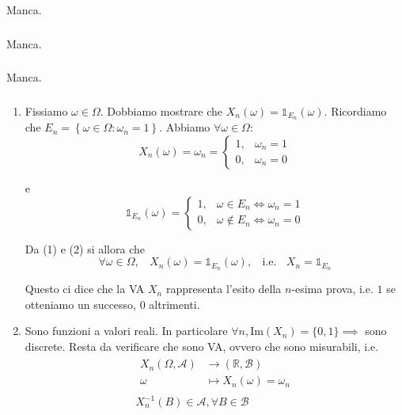 Manca.
\subsubsection{}

Manca.
\subsubsection{}

Manca.
\subsubsection{}
\begin{enumerate}
\item Fissiamo $\omega \in \Omega $. Dobbiamo mostrare che $X_{n}\left( \omega \right) =\mathbb{1}_{E_{n}}\left( \omega \right)$. Ricordiamo che $E_{n} =\left\{\omega \in \Omega :\omega _{n} =1\right\}$. Abbiamo $\forall \omega \in \Omega $:\begin{equation}
X_{n}\left( \omega \right) =\omega _{n} =\begin{cases}
1, & \omega _{n} =1\\
0, & \omega _{n} =0
\end{cases}
\end{equation}

e\begin{equation}
\mathbb{1}_{E_{n}}\left( \omega \right) =\begin{cases}
1, & \omega \in E_{n} \iff \omega _{n} =1\\
0, & \omega \notin E_{n} \iff \omega _{n} =0
\end{cases}
\end{equation}

Da (1) e (2) si allora che\begin{equation*}
\forall \omega \in \Omega ,\ \ \ \ X_{n}\left( \omega \right) =\mathbb{1}_{E_{n}}\left( \omega \right) ,\ \ \ \ \text{i.e.} \ \ \ \ X_{n} =\mathbb{1}_{E_{n}}
\end{equation*}

\begin{oss}
Questo ci dice che la VA $X_{n}$ rappresenta l'esito della $n$-esima prova, i.e. $1$ se otteniamo un successo, $0$ altrimenti.
\end{oss}
\item Sono funzioni a valori reali. In particolare $\forall n,\mathrm{Im}( X_{n}) =\{0,1\} \implies $ sono discrete. Resta da verificare che sono VA, ovvero che sono misurabili, i.e.\begin{gather*}
\begin{aligned}
X_{n}( \Omega ,\mathcal{A}) & \rightarrow (\mathbb{R} ,\mathcal{B})\\
\omega  & \mapsto X_{n}( \omega ) =\omega _{n}
\end{aligned}\\
X_{n}^{-1}( B) \in \mathcal{A} ,\forall B\in \mathcal{B}
\end{gather*}


\end{enumerate}
